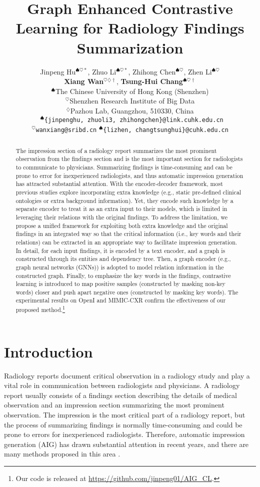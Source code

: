 \documentclass[11pt]{article}
\title{Graph Enhanced Contrastive Learning for Radiology Findings Summarization}
\author{%
Jinpeng Hu$^{\spadesuit\heartsuit *}$, \hspace{0.2cm}
Zhuo Li$^{\spadesuit\heartsuit *}$, \hspace{0.2cm}
Zhihong Chen$^{\spadesuit\heartsuit}$, \hspace{0.2cm}
Zhen Li$^{\spadesuit\heartsuit}$ \\
 \textbf{Xiang Wan}$^{\heartsuit\diamondsuit\dag}$, \hspace{0.2cm} \textbf{Tsung-Hui Chang}$^{\spadesuit\heartsuit\dag}$ \\
$^{\spadesuit}$The Chinese University of Hong Kong (Shenzhen) \\ 
$^{\heartsuit}$Shenzhen Research Institute of Big Data \hspace{0.2cm} \\
$^{\diamondsuit}$Pazhou Lab, Guangzhou, 510330, China \hspace{0.2cm} \\
%
\texttt{
$^\spadesuit$\{jinpenghu, zhuoli3, zhihongchen\}@link.cuhk.edu.cn} \\
% 
\texttt{$^{\heartsuit}$wanxiang@sribd.cn} \hspace{0.2cm}
% 
\texttt{$^{\spadesuit}$\{lizhen, changtsunghui\}@cuhk.edu.cn}
}
\begin{document}
\maketitle

\def\thefootnote{*}
\def\thefootnote{\dag}
\renewcommand{\thefootnote}{\arabic{footnote}}

\begin{abstract}
The impression section of a radiology report summarizes the most prominent observation from the findings section and is the most important section for radiologists to communicate to physicians.
Summarizing findings is time-consuming and can be prone to error for inexperienced radiologists, and thus automatic impression generation has attracted substantial attention.
With the encoder-decoder framework, most previous studies explore incorporating extra knowledge (e.g., static pre-defined clinical ontologies or extra background information).
Yet, they encode such knowledge by a separate encoder to treat it as an extra input to their models, which is limited in leveraging their relations with the original findings.
To address the limitation, we propose a unified framework for exploiting both extra knowledge and the original findings in an integrated way so that the critical information (i.e., key words and their relations) can be extracted in an appropriate way to facilitate impression generation.
In detail, for each input findings, it is encoded by a text encoder, and a graph is constructed through its entities and dependency tree.
Then, a graph encoder (e.g., graph neural networks (GNNs)) is adopted to model relation information in the constructed graph.
Finally, to emphasize the key words in the findings, contrastive learning is introduced to map positive samples (constructed by masking non-key words) closer and push apart negative ones (constructed by masking key words).
The experimental results on OpenI and MIMIC-CXR confirm the effectiveness of our proposed method.\footnote{Our code is released at \url{https://github.com/jinpeng01/AIG_CL}.}
\end{abstract}


\section{Introduction}
Radiology reports document critical observation in a radiology study and play a vital role in communication between radiologists and physicians.
%
A radiology report usually consists of a findings section describing the details of medical observation and an impression section summarizing the most prominent observation.
%
The impression is the most critical part of a radiology report, but the process of summarizing findings is normally time-consuming and could be prone to errors for inexperienced radiologists.
%
Therefore, automatic impression generation (AIG) has drawn substantial attention in recent years, and there are many methods proposed in this area \cite{zhang2018learning,attend,macavaney2019ontology,shieh2019towards}.
\end{document}
